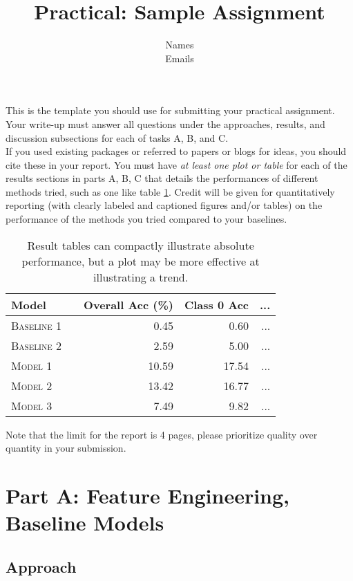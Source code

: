 \documentclass[11pt]{article}
\title{Practical: Sample Assignment}
\author{Names \\ Emails}
\date{}
\begin{document}
\maketitle{}


\noindent This is the template you should use for submitting your practical assignment. 
Your write-up must
answer all questions under the approaches, results, and discussion subsections
for each of tasks A, B, and C. \\

\noindent If you used existing packages or referred to papers or blogs for ideas,  you should cite these in your report.  You must have \textit{at least one plot or table}
for each of the results sections in parts A, B, C
that details the performances of different methods tried, such as one like table \ref{tab:results}. Credit will be given for quantitatively reporting (with clearly
labeled and captioned figures and/or tables) on the performance of the
methods you tried compared to your baselines.\\

\begin{table}
\centering
\begin{tabular}{llrrr}
 \toprule
 Model &  & Overall Acc (\%) & Class 0 Acc & ... \\
 \midrule
 \textsc{Baseline 1} & & 0.45 & 0.60 & ...\\
 \textsc{Baseline 2} & & 2.59 & 5.00 & ... \\
 \textsc{Model 1} & & 10.59 & 17.54 & ... \\
 \textsc{Model 2} & &13.42 & 16.77 & ... \\
 \textsc{Model 3} & & 7.49 & 9.82 & ... \\
 \bottomrule
\end{tabular}
\caption{\label{tab:results} Result tables can compactly illustrate absolute performance, but a plot may be more effective at illustrating a trend.}
\end{table}


\noindent Note that the limit for the report is 4 pages, please prioritize quality over 
quantity in your submission.\\

\section{Part A: Feature Engineering, Baseline Models}

\subsection{Approach}
\end{document}
